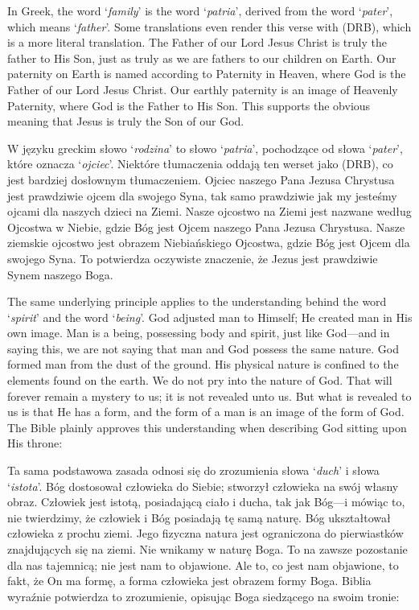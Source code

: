 In Greek, the word ‘\textit{family}’ is the word ‘\textit{patria}’, derived from the word ‘\textit{pater}’, which means ‘\textit{father}’. Some translations even render this verse with  (DRB), which is a more literal translation. The Father of our Lord Jesus Christ is truly the father to His Son, just as truly as we are fathers to our children on Earth. Our paternity on Earth is named according to Paternity in Heaven, where God is the Father of our Lord Jesus Christ. Our earthly paternity is an image of Heavenly Paternity, where God is the Father to His Son. This supports the obvious meaning that Jesus is truly the Son of our God.


W języku greckim słowo ‘\textit{rodzina}’ to słowo ‘\textit{patria}’, pochodzące od słowa ‘\textit{pater}’, które oznacza ‘\textit{ojciec}’. Niektóre tłumaczenia oddają ten werset jako  (DRB), co jest bardziej dosłownym tłumaczeniem. Ojciec naszego Pana Jezusa Chrystusa jest prawdziwie ojcem dla swojego Syna, tak samo prawdziwie jak my jesteśmy ojcami dla naszych dzieci na Ziemi. Nasze ojcostwo na Ziemi jest nazwane według Ojcostwa w Niebie, gdzie Bóg jest Ojcem naszego Pana Jezusa Chrystusa. Nasze ziemskie ojcostwo jest obrazem Niebiańskiego Ojcostwa, gdzie Bóg jest Ojcem dla swojego Syna. To potwierdza oczywiste znaczenie, że Jezus jest prawdziwie Synem naszego Boga.


The same underlying principle applies to the understanding behind the word ‘\textit{spirit}’ and the word ‘\textit{being}’. God adjusted man to Himself; He created man in His own image. Man is a being, possessing body and spirit, just like God—and in saying this, we are not saying that man and God possess the same nature. God formed man from the dust of the ground. His physical nature is confined to the elements found on the earth. We do not pry into the nature of God. That will forever remain a mystery to us; it is not revealed unto us. But what is revealed to us is that He has a form, and the form of a man is an image of the form of God. The Bible plainly approves this understanding when describing God sitting upon His throne:


Ta sama podstawowa zasada odnosi się do zrozumienia słowa ‘\textit{duch}’ i słowa ‘\textit{istota}’. Bóg dostosował człowieka do Siebie; stworzył człowieka na swój własny obraz. Człowiek jest istotą, posiadającą ciało i ducha, tak jak Bóg—i mówiąc to, nie twierdzimy, że człowiek i Bóg posiadają tę samą naturę. Bóg ukształtował człowieka z prochu ziemi. Jego fizyczna natura jest ograniczona do pierwiastków znajdujących się na ziemi. Nie wnikamy w naturę Boga. To na zawsze pozostanie dla nas tajemnicą; nie jest nam to objawione. Ale to, co jest nam objawione, to fakt, że On ma formę, a forma człowieka jest obrazem formy Boga. Biblia wyraźnie potwierdza to zrozumienie, opisując Boga siedzącego na swoim tronie:



